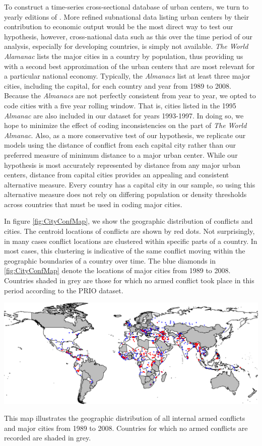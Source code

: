 To construct a time-series cross-sectional database of urban centers, we turn to yearly editions of \citet{worldalmanac:1989}. More refined subnational data listing urban centers by their contribution to economic output would be the most direct way to test our hypothesis, however, cross-national data such as this over the time period of our analysis, especially for developing countries, is simply not available. \emph{The World Alamanac} lists the major cities in a country by population, thus providing us with a second best approximation of the urban centers that are most relevant for a particular national economy. Typically, the \emph{Almanacs} list at least three major cities, including the capital, for each country and year from 1989 to 2008. Because the \emph{Almanacs} are not perfectly consistent from year to year, we opted to code cities with a five year rolling window. That is, cities listed in the 1995 \emph{Almanac} are also included in our dataset for years 1993-1997. In doing so, we hope to minimize the effect of coding inconsistencies on the part of \emph{The World Almanac}. Also, as a more conservative test of our hypothesis, we replicate our models using the distance of conflict from each capital city rather than our preferred measure of minimum distance to a major urban center. While our hypothesis is most accurately represented by distance from any major urban centers, distance from capital cities provides an appealing and consistent alternative measure. Every country has a capital city in our sample, so using this alternative measure does not rely on differing population or density thresholds across countries that must be used in coding major cities.

In figure \ref{fig:CityConfMap}, we show the geographic distribution of conflicts and cities. The centroid locations of conflicts are shown by red dots. Not surprisingly, in many cases conflict locations are clustered within specific parts of a country. In most cases, this clustering is indicative of the same conflict moving within the geographic boundaries of a country over time. The blue diamonds in \ref{fig:CityConfMap} denote the locations of major cities from 1989 to 2008. Countries shaded in grey are those for which no armed conflict took place in this period according to the PRIO dataset.  

\begin{amssidewaysfigure}
	\centering
	\includegraphics[width=1\textwidth]{CityConfMap-crop}
	\caption{This map illustrates the geographic distribution of all internal armed conflicts and major cities from 1989 to 2008. Countries for which no armed conflicts are recorded are shaded in grey.}
	\label{fig:CityConfMap}
\end{amssidewaysfigure}
\FloatBarrier

